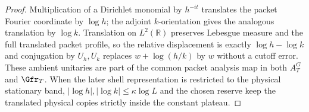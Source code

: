 \begin{proof}
Multiplication of a Dirichlet monomial by $h^{-it}$ translates the packet
Fourier coordinate by $\log h$; the adjoint $k$-orientation gives the analogous
translation by $\log k$. Translation on $L^2(\mathbb R)$ preserves Lebesgue
measure and the full translated packet profile, so the relative displacement is
exactly $\log h-\log k$ and conjugation by $U_h,U_k$ replaces
$w+\log(h/k)$ by $w$ without a cutoff error. These ambient unitaries are part
of the common packet analysis map in both $A_T^G$ and $\Gfr_T$. When the later
shell representation is restricted to the physical stationary band,
$|\log h|,|\log k|\le\kappa\log L$ and the chosen reserve keep the translated
physical copies strictly inside the constant plateau.
\end{proof}

